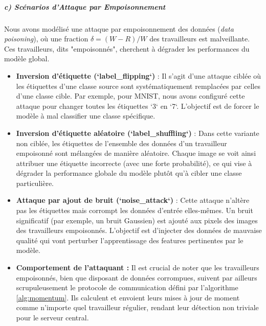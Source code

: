 \documentclass{article}
\begin{document}
\subparagraph{c) Scénarios d'Attaque par Empoisonnement}
Nous avons modélisé une attaque par empoisonnement des données (\textit{data poisoning}), où une fraction $\delta = (W-R)/W$ des travailleurs est malveillante. Ces travailleurs, dits "empoisonnés", cherchent à dégrader les performances du modèle global.
\begin{itemize}
    \item \textbf{Inversion d'étiquette (`label_flipping`)} : Il s'agit d'une attaque ciblée où les étiquettes d'une classe source sont systématiquement remplacées par celles d'une classe cible. Par exemple, pour MNIST, nous avons configuré cette attaque pour changer toutes les étiquettes `3` en `7`. L'objectif est de forcer le modèle à mal classifier une classe spécifique.
    \item \textbf{Inversion d'étiquette aléatoire (`label_shuffling`)} : Dans cette variante non ciblée, les étiquettes de l'ensemble des données d'un travailleur empoisonné sont mélangées de manière aléatoire. Chaque image se voit ainsi attribuer une étiquette incorrecte (avec une forte probabilité), ce qui vise à dégrader la performance globale du modèle plutôt qu'à cibler une classe particulière.
    \item \textbf{Attaque par ajout de bruit (`noise_attack`)} : Cette attaque n'altère pas les étiquettes mais corrompt les données d'entrée elles-mêmes. Un bruit significatif (par exemple, un bruit Gaussien) est ajouté aux pixels des images des travailleurs empoisonnés. L'objectif est d'injecter des données de mauvaise qualité qui vont perturber l'apprentissage des features pertinentes par le modèle.
    \item \textbf{Comportement de l'attaquant :} Il est crucial de noter que les travailleurs empoisonnés, bien que disposant de données corrompues, suivent par ailleurs scrupuleusement le protocole de communication défini par l'algorithme \ref{alg:momentum}. Ils calculent et envoient leurs mises à jour de moment comme n'importe quel travailleur régulier, rendant leur détection non triviale pour le serveur central.
\end{itemize}
\end{document}
